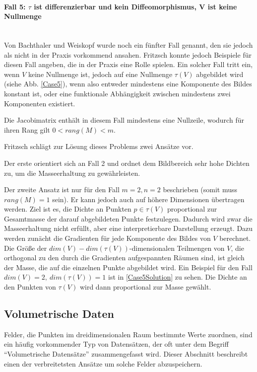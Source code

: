 \documentclass[a4paper,fontsize=12pt,toc=bib,halfparskip]{scrartcl}
\begin{document}
\paragraph{Fall 5: $\tau$ ist differenzierbar und kein Diffeomorphismus, V ist keine Nullmenge}\mbox{}\\
Von Bachthaler und Weiskopf wurde noch ein f\"unfter Fall genannt, den sie jedoch als nicht in der Praxis vorkommend ansahen. Fritzsch konnte jedoch Beispiele f\"ur diesen Fall angeben\cite[S.~23~f.]{fritzsch2016continuousScatterplot}, die in der Praxis eine Rolle spielen. Ein solcher Fall tritt ein, wenn $V$ keine Nullmenge ist, jedoch auf eine Nullmenge $\tau(V)$ abgebildet wird (siehe Abb. \ref{Case5}), wenn also entweder mindestens eine Komponente des Bildes konstant ist, oder eine funktionale Abh\"angigkeit zwischen mindestens zwei Komponenten existiert. 

Die Jacobimatrix enth\"alt in diesem Fall mindestens eine Nullzeile, wodurch f\"ur ihren Rang gilt $0 < rang(M) < m$. 

Fritzsch schl\"agt zur L\"osung dieses Problems zwei Ans\"atze vor. 

Der erste orientiert sich an Fall 2 und ordnet dem Bildbereich sehr hohe Dichten zu, um die Masseerhaltung zu gew\"ahrleisten. 

Der zweite Ansatz ist nur f\"ur den Fall $m=2, n=2$ beschrieben (somit muss $rang(M) = 1$ sein). Er kann jedoch auch auf h\"ohere Dimensionen \"ubertragen werden. Ziel ist es, die Dichte an Punkten $p\in\tau(V)$ proportional zur Gesamtmasse der darauf abgebildeten Punkte festzulegen. Dadurch wird zwar die Masseerhaltung nicht erf\"ullt, aber eine interpretierbare Darstellung erzeugt. Dazu werden zun\"acht die Gradienten f\"ur jede Komponente des Bildes von $V$ berechnet. Die Gr\"o{\ss}e der $dim(V) - dim(\tau(V))$-dimensionalen Teilmengen von $V$, die orthogonal zu den durch die Gradienten aufgespannten R\"aumen sind, ist gleich der Masse, die auf die einzelnen Punkte abgebildet wird. Ein Beispiel f\"ur den Fall $dim(V) = 2,~dim(\tau(V)) = 1$ ist in \ref{Case5Solution} zu sehen. Die Dichte an den Punkten von $\tau(V)$ wird dann proportional zur Masse gew\"ahlt.

\subsection{Volumetrische Daten}
Felder, die Punkten im dreidimensionalen Raum bestimmte Werte zuordnen, sind ein h\"aufig vorkommender Typ von Datens\"atzen, der oft unter dem Begriff ``Volumetrische Datens\"atze'' zusammengefasst wird. Dieser Abschnitt beschreibt einen der verbreitetsten Ans\"atze um solche Felder abzuspeichern.  
\end{document}
